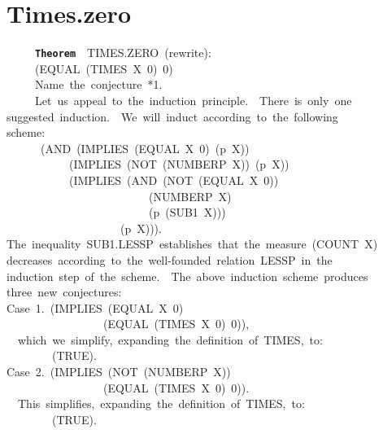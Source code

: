 \documentclass[11pt]{book}
\newenvironment{pubasis}{\begin{flushleft}\ttfamily\small}{\normalsize\rmfamily\end{flushleft}}
\newcommand{\axiomordefinition}[1]{\vspace{6pt}\texttt{\textbf{#1}}}
\newcommand{\pubdefaulttextsize}{\large}
\begin{document}
\section{Times.zero}
\pubdefaulttextsize
\begin{pubasis}
~~~~~\axiomordefinition{Theorem}~~TIMES.ZERO~(rewrite):\\
~~~~~(EQUAL~(TIMES~X~0)~0)\\

~~~~~Name~the~conjecture~*1.\\

~~~~~Let~us~appeal~to~the~induction~principle.~~There~is~only~one\\
suggested~induction.~~We~will~induct~according~to~the~following\\
scheme:\\
~~~~~~(AND~(IMPLIES~(EQUAL~X~0)~(p~X))\\
~~~~~~~~~~~(IMPLIES~(NOT~(NUMBERP~X))~(p~X))\\
~~~~~~~~~~~(IMPLIES~(AND~(NOT~(EQUAL~X~0))\\
~~~~~~~~~~~~~~~~~~~~~~~~~(NUMBERP~X)\\
~~~~~~~~~~~~~~~~~~~~~~~~~(p~(SUB1~X)))\\
~~~~~~~~~~~~~~~~~~~~(p~X))).\\
The~inequality~SUB1.LESSP~establishes~that~the~measure~(COUNT~X)\\
decreases~according~to~the~well-founded~relation~LESSP~in~the\\
induction~step~of~the~scheme.~~The~above~induction~scheme~produces\\
three~new~conjectures:\\

Case~1.~(IMPLIES~(EQUAL~X~0)\\
~~~~~~~~~~~~~~~~~(EQUAL~(TIMES~X~0)~0)),\\

~~which~we~simplify,~expanding~the~definition~of~TIMES,~to:\\

~~~~~~~~(TRUE).\\

Case~2.~(IMPLIES~(NOT~(NUMBERP~X))\\
~~~~~~~~~~~~~~~~~(EQUAL~(TIMES~X~0)~0)).\\

~~This~simplifies,~expanding~the~definition~of~TIMES,~to:\\

~~~~~~~~(TRUE).\\


\end{pubasis}
\end{document}
